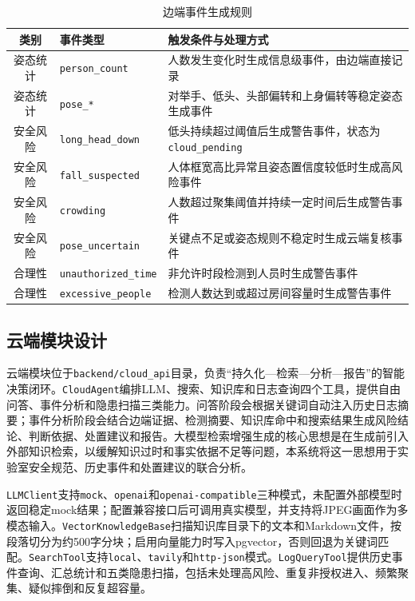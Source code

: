 \begin{table}[H]
\caption{边端事件生成规则}
\begin{center}
\begin{tabular}{clp{7.8cm}}
\toprule
类别 & 事件类型 & 触发条件与处理方式 \\
\midrule
姿态统计 & \texttt{person\_count} & 人数发生变化时生成信息级事件，由边端直接记录 \\
姿态统计 & \texttt{pose\_*} & 对举手、低头、头部偏转和上身偏转等稳定姿态生成事件 \\
安全风险 & \texttt{long\_head\_down} & 低头持续超过阈值后生成警告事件，状态为\texttt{cloud\_pending} \\
安全风险 & \texttt{fall\_suspected} & 人体框宽高比异常且姿态置信度较低时生成高风险事件 \\
安全风险 & \texttt{crowding} & 人数超过聚集阈值并持续一定时间后生成警告事件 \\
安全风险 & \texttt{pose\_uncertain} & 关键点不足或姿态规则不稳定时生成云端复核事件 \\
合理性 & \texttt{unauthorized\_time} & 非允许时段检测到人员时生成警告事件 \\
合理性 & \texttt{excessive\_people} & 检测人数达到或超过房间容量时生成警告事件 \\
\bottomrule
\end{tabular}
\end{center}
\label{tb:events}
\end{table}

\subsection{云端模块设计}

云端模块位于\verb|backend/cloud_api|目录，负责“持久化—检索—分析—报告”的智能决策闭环。\verb|CloudAgent|编排LLM、搜索、知识库和日志查询四个工具，提供自由问答、事件分析和隐患扫描三类能力。问答阶段会根据关键词自动注入历史日志摘要；事件分析阶段会结合边端证据、检测摘要、知识库命中和搜索结果生成风险结论、判断依据、处置建议和报告。大模型检索增强生成的核心思想是在生成前引入外部知识检索，以缓解知识过时和事实依据不足等问题，本系统将这一思想用于实验室安全规范、历史事件和处置建议的联合分析。

\verb|LLMClient|支持\verb|mock|、\verb|openai|和\verb|openai-compatible|三种模式，未配置外部模型时返回稳定mock结果；配置兼容接口后可调用真实模型，并支持将JPEG画面作为多模态输入。\verb|VectorKnowledgeBase|扫描知识库目录下的文本和Markdown文件，按段落切分为约500字分块；启用向量能力时写入pgvector，否则回退为关键词匹配。\verb|SearchTool|支持\verb|local|、\verb|tavily|和\verb|http-json|模式。\verb|LogQueryTool|提供历史事件查询、汇总统计和五类隐患扫描，包括未处理高风险、重复非授权进入、频繁聚集、疑似摔倒和反复超容量。

